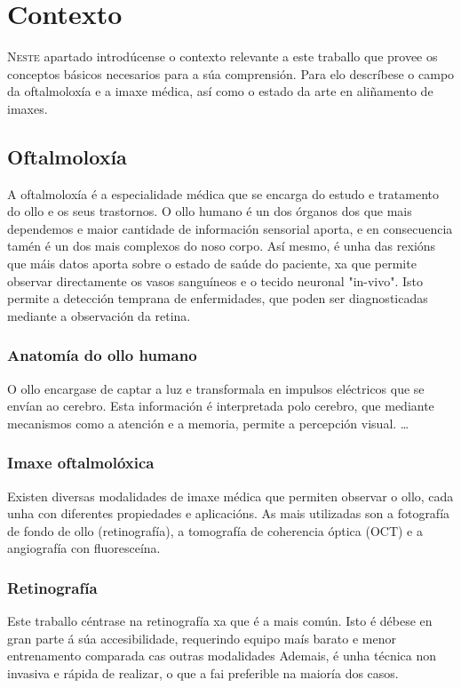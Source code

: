 \chapter{Contexto}
\label{chap:contexto}

\lettrine{N}{este} apartado introdúcense o contexto relevante a este traballo que provee os conceptos básicos necesarios para a súa comprensión.
Para elo descríbese o campo da oftalmoloxía e a imaxe médica, así como o estado da arte en aliñamento de imaxes.
\section{Oftalmoloxía}
\label{sec:Oftalmoloxía}
A oftalmoloxía é a especialidade médica que se encarga do estudo e tratamento do ollo e os seus trastornos.
 O ollo humano é un dos órganos dos que mais dependemos e maior cantidade de información sensorial aporta, e en consecuencia tamén é un dos mais complexos do noso corpo.
 Así mesmo, é unha das rexións que máis datos aporta sobre o estado de saúde do paciente, xa que permite observar directamente os vasos sanguíneos e o tecido neuronal "in-vivo".
 Isto permite a detección temprana de enfermidades, que poden ser diagnosticadas mediante a observación da retina.
\subsection{Anatomía do ollo humano}
\label{subsec:Anatomía do ollo humano}
O ollo encargase de captar a luz e transformala en impulsos eléctricos que se envían ao cerebro.
 Esta información é interpretada polo cerebro, que mediante mecanismos como a atención e a memoria, permite a percepción visual.
 \dots

\subsection{Imaxe oftalmolóxica}
\label{subsec:Imaxe oftalmolóxica}
Existen diversas modalidades de imaxe médica que permiten observar o ollo, cada unha con diferentes propiedades e aplicacións. 
As mais utilizadas son a fotografía de fondo de ollo (retinografía), a tomografía de coherencia óptica (OCT) e a angiografía con fluoresceína.

\subsection{Retinografía}
\label{subsec:Retinografía}
Este traballo céntrase na retinografía xa que é a mais común.
Isto é débese en gran parte á súa accesibilidade, requerindo equipo maís barato e menor entrenamento comparada cas outras modalidades
Ademais, é unha técnica non invasiva e rápida de realizar, o que a fai preferible na maioría dos casos.

